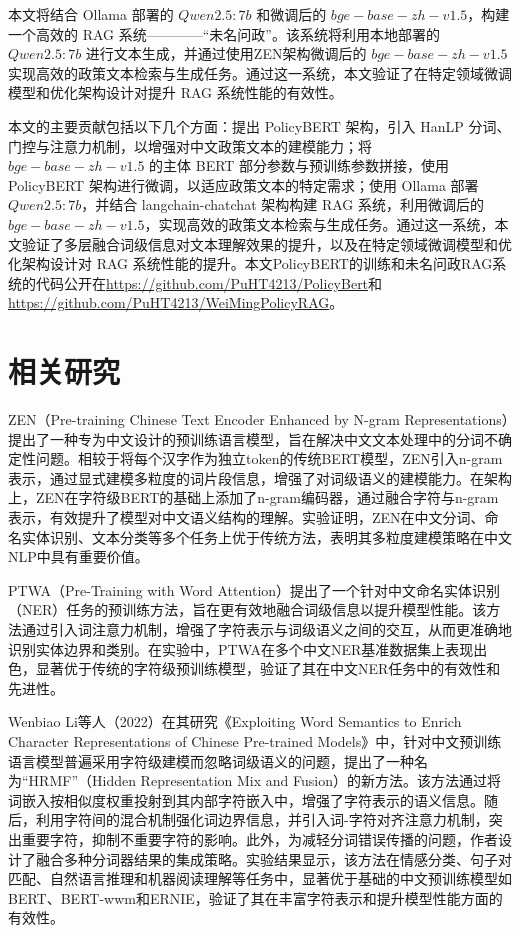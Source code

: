 \documentclass[12pt, a4paper]{ctexart}
\begin{document}
本文将结合 Ollama 部署的 $Qwen2.5:7b$ 和微调后的 $ bge-base-zh-v1.5 $，构建一个高效的 RAG 系统————“未名问政”。该系统将利用本地部署的 $Qwen2.5:7b$ 进行文本生成，并通过使用ZEN架构微调后的 $ bge-base-zh-v1.5 $ 实现高效的政策文本检索与生成任务。通过这一系统，本文验证了在特定领域微调模型和优化架构设计对提升 RAG 系统性能的有效性。

本文的主要贡献包括以下几个方面：提出 PolicyBERT 架构，引入 HanLP 分词、门控与注意力机制，以增强对中文政策文本的建模能力；将 $ bge-base-zh-v1.5 $ 的主体 BERT 部分参数与预训练参数拼接，使用 PolicyBERT 架构进行微调，以适应政策文本的特定需求；使用 Ollama 部署 $Qwen2.5:7b$，并结合 langchain-chatchat 架构构建 RAG 系统，利用微调后的 $ bge-base-zh-v1.5 $，实现高效的政策文本检索与生成任务。通过这一系统，本文验证了多层融合词级信息对文本理解效果的提升，以及在特定领域微调模型和优化架构设计对 RAG 系统性能的提升。本文PolicyBERT的训练和未名问政RAG系统的代码公开在\url{https://github.com/PuHT4213/PolicyBert}和\url{https://github.com/PuHT4213/WeiMingPolicyRAG}。




\section{相关研究}
ZEN（Pre-training Chinese Text Encoder Enhanced by N-gram Representations）提出了一种专为中文设计的预训练语言模型，旨在解决中文文本处理中的分词不确定性问题\cite{diao-etal-2020-zen}。相较于将每个汉字作为独立token的传统BERT模型，ZEN引入n-gram表示，通过显式建模多粒度的词片段信息，增强了对词级语义的建模能力。在架构上，ZEN在字符级BERT的基础上添加了n-gram编码器，通过融合字符与n-gram表示，有效提升了模型对中文语义结构的理解。实验证明，ZEN在中文分词、命名实体识别、文本分类等多个任务上优于传统方法，表明其多粒度建模策略在中文NLP中具有重要价值。

PTWA（Pre-Training with Word Attention）提出了一个针对中文命名实体识别（NER）任务的预训练方法，旨在更有效地融合词级信息以提升模型性能\cite{Ma2021PTWAPW}。该方法通过引入词注意力机制，增强了字符表示与词级语义之间的交互，从而更准确地识别实体边界和类别。在实验中，PTWA在多个中文NER基准数据集上表现出色，显著优于传统的字符级预训练模型，验证了其在中文NER任务中的有效性和先进性。

Wenbiao Li等人（2022）在其研究《Exploiting Word Semantics to Enrich Character Representations of Chinese Pre-trained Models》中，针对中文预训练语言模型普遍采用字符级建模而忽略词级语义的问题，提出了一种名为“HRMF”（Hidden Representation Mix and Fusion）的新方法\cite{Li2022ExploitingWS}。该方法通过将词嵌入按相似度权重投射到其内部字符嵌入中，增强了字符表示的语义信息。随后，利用字符间的混合机制强化词边界信息，并引入词-字符对齐注意力机制，突出重要字符，抑制不重要字符的影响。此外，为减轻分词错误传播的问题，作者设计了融合多种分词器结果的集成策略。实验结果显示，该方法在情感分类、句子对匹配、自然语言推理和机器阅读理解等任务中，显著优于基础的中文预训练模型如BERT、BERT-wwm和ERNIE，验证了其在丰富字符表示和提升模型性能方面的有效性。
\end{document}
